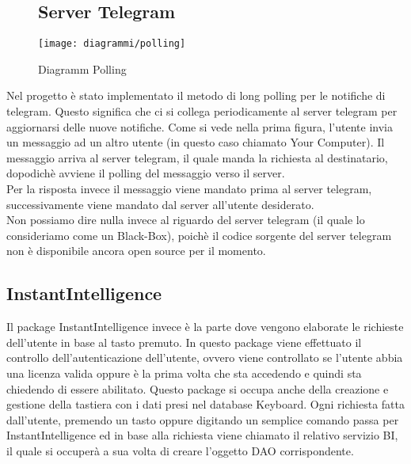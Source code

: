 \begin{figure}
\subsection{Server Telegram}
\label{sec:backend}
 \begin{center}
     \texttt{[image: diagrammi/polling]} 
    \caption{Diagramm Polling }
    \end{center}

\end{figure}  

\clearpage




Nel progetto è stato implementato il metodo di long polling per le notifiche di telegram. Questo significa che ci si collega periodicamente al server telegram per aggiornarsi delle nuove notifiche. Come si vede nella prima figura, l'utente invia un messaggio ad un altro utente (in questo caso chiamato Your Computer). Il messaggio arriva al server telegram, il quale manda la richiesta al destinatario, dopodichè avviene il polling del messaggio verso il server. \\
Per la risposta invece il messaggio viene mandato prima al server telegram, successivamente viene mandato dal server all’utente desiderato.
\\Non possiamo dire nulla invece al riguardo del server telegram (il quale lo consideriamo come un Black-Box), poichè il codice sorgente del server telegram  non è disponibile ancora open source per il momento.


%


\subsection{InstantIntelligence}

Il package InstantIntelligence invece è la parte dove vengono elaborate le richieste dell'utente in base al tasto premuto. In questo package viene effettuato il controllo dell’autenticazione dell'utente, ovvero viene controllato se l’utente abbia una licenza valida oppure è la prima volta che sta accedendo e quindi sta chiedendo di essere abilitato.  Questo package si occupa anche della creazione e gestione della tastiera con i dati presi nel database Keyboard. Ogni richiesta fatta dall'utente, premendo un tasto oppure digitando un semplice comando passa per InstantIntelligence ed in base alla richiesta viene chiamato il relativo servizio BI, il quale si occuperà a sua volta di creare l'oggetto DAO corrispondente. \\\\

